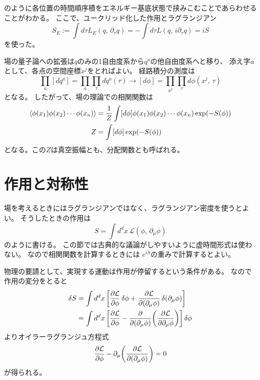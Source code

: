 \documentclass[../../master.tex]{subfiles}
\begin{document}
のように各位置の時間順序積をエネルギー基底状態で挟みこむことであらわせることがわかる。
ここで、ユークリッド化した作用とラグランジアン
\begin{equation}
    S_E := \int d\tau L_E(q,\,\partial_\tau q) = - \int d\tau L(q,\,i\partial_\tau q) = i S
\end{equation}
を使った。

場の量子論への拡張は\(q\)のみの1自由度系から\(q^a\)の他自由度系へと移り、
添え字\(a\)として、各点の空間座標\(x^j\)をとればよい。
経路積分の測度は
\begin{equation}
    \prod_a [dq^a] = \prod_{a}\prod_{\tau} dq^a(\tau) \rightarrow [d\phi] = \prod_{x^j}\prod_{\tau}d\phi(x^j,\,\tau)
\end{equation}
となる。
したがって、場の理論での相関関数は
\begin{align}
    \ev{\phi(x_1)\phi(x_2)\cdots\phi(x_n)}
    &= \frac{1}{Z} \int[d\phi] \phi(x_1)\phi(x_2)\cdots\phi(x_n) \exp(-S(\phi))\\
    Z
    &= \int[d\phi] \exp(-S(\phi))
\end{align}
となる。この\(Z\)は真空振幅とも、分配関数とも呼ばれる。

\section{作用と対称性}
場を考えるときにはラグランジアンではなく、ラグランジアン密度を使うとよい。
そうしたときの作用は
\begin{equation*}
    S = \int d^dx\, \mathcal{L}(\phi,\,\partial_\mu \phi)
\end{equation*}
のように書ける。
この節では古典的な議論がしやすいように虚時間形式は使わない。
なので相関関数を計算するときには
\(e^{iS}\)の重みで計算するとよい。

物理の要請として、実現する運動は作用が停留するという条件がある。
なので作用の変分をとると
\begin{align}
    \var{S}
    &= \int d^d x\, \qty[\pdv{\mathcal{L}}{\phi}\var{\phi}+\pdv{\mathcal{L}}{(\partial_\mu \phi)}\var(\partial_\mu \phi)] \notag\\
    &= \int d^d x\, \qty[\pdv{\mathcal{L}}{\phi}-\pdv{(\partial_\mu \phi)}\qty(\pdv{\mathcal{L}}{\partial_\mu \phi})]\var{\phi}
\end{align}
よりオイラーラグランジュ方程式
\begin{equation}
    \pdv{\mathcal{L}}{\phi}-\partial_\mu\qty(\pdv{\mathcal{L}}{(\partial_\mu \phi)}) = 0
\end{equation}
が得られる。
\end{document}
